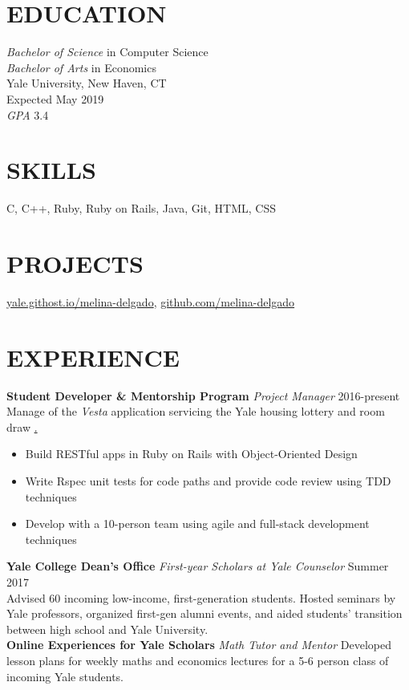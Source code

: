 \documentclass[margin, centered]{res}
\begin{document}
\address{130 Prospect St \\ New Haven, CT 06511 \\ (954) 682-8999 \\ melina.delgado@yale.edu}

\begin{resume}
  \section{EDUCATION}
  \textit{Bachelor of Science} in Computer Science \\
  \textit{Bachelor of Arts} in Economics \\
  Yale University, New Haven, CT \\
  Expected May 2019 \\
  \textit{GPA} 3.4

  \section{SKILLS}
  C, C++, Ruby, Ruby on Rails, Java, Git, HTML, CSS
  
  \section{PROJECTS}
  \href{http://yale.githost.io/melina-delgado}{yale.githost.io/melina-delgado},  
  \href{http://github.com/melina-delgado}{github.com/melina-delgado}

  \section{EXPERIENCE}
  \textbf{Student Developer \&  Mentorship Program} \textit{Project Manager} \hfill 2016-present \\
  Manage of the \textit{Vesta} application servicing the Yale housing lottery and room draw \href{yale.githost.io/sdmp/rails/vesta}. 
  \begin{itemize}
    \item Build RESTful apps in Ruby on Rails with Object-Oriented Design
    \item Write Rspec unit tests for code paths and provide code review using TDD techniques
    \item Develop with a 10-person team using agile and full-stack development techniques
  \end{itemize}
  \textbf{Yale College Dean's Office} \textit{First-year Scholars at Yale Counselor} \hfill Summer 2017 \\
  Advised 60 incoming low-income, first-generation students. Hosted seminars by Yale professors, organized first-gen alumni events, and aided students' transition between high school and Yale University.  \\
  \textbf{Online Experiences for Yale Scholars} \textit{Math Tutor and Mentor}
  Developed lesson plans for weekly maths and economics lectures for a 5-6 person class of incoming Yale students.


\end{resume}
\end{document}
